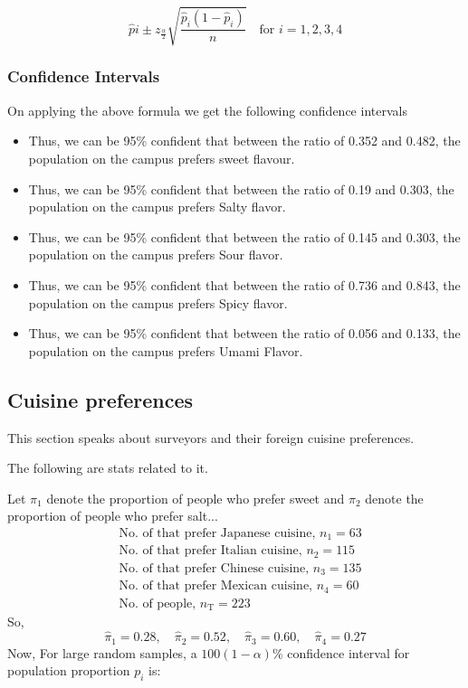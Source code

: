 \documentclass[12pt]{article}
\begin{document}
    
    
    \[
    \hat{p}i \pm z_{\frac{\alpha}{2}} \sqrt{\frac{\hat{p}_i(1 - \hat{p}_i)}{n}}
    \quad \text{for } i = 1, 2, 3, 4
    \]
\subsubsection{Confidence Intervals}
    On applying the above formula we get the following confidence intervals
    \begin{itemize}
        \item Thus, we can be 95\% confident that between the ratio of 0.352 and 0.482, the population on the campus prefers sweet flavour.
        
        \item Thus, we can be 95\% confident that between the ratio of 0.19 and 0.303, the population on the campus prefers Salty flavor.
        
        \item Thus, we can be 95\% confident that between the ratio of 0.145 and 0.303, the population on the campus prefers Sour flavor.
        
        \item Thus, we can be 95\% confident that between the ratio of 0.736 and 0.843, the population on the campus prefers Spicy flavor.
        
        \item Thus, we can be 95\% confident that between the ratio of 0.056 and 0.133, the population on the campus prefers Umami Flavor.
    \end{itemize}


\subsection{Cuisine preferences }
 This section speaks about surveyors and their foreign cuisine preferences.
    
    The following are stats related to it.
    
    Let $\pi_1$ denote the proportion of people who prefer sweet and $\pi_2$ denote the proportion of people who prefer salt...
    \begin{align}
        &\text{No. of that prefer Japanese cuisine, } n_{\text{1}} = 63 \\
        &\text{No. of that prefer Italian cuisine, } n_{\text{2}} = 115 \\
        &\text{No. of that prefer Chinese cuisine, } n_{\text{3}} = 135\\
        &\text{No. of that prefer Mexican cuisine, } n_{\text{4}} = 60\\
        &\text{No. of people, } n_{\text{T}} = 223
    \end{align}
    So,
    \begin{equation}
        \hat{\pi}_1  = 0.28, \quad \hat{\pi}_2  = 0.52, \quad \hat{\pi}_3  = 0.60, \quad \hat{\pi}_4  = 0.27
    \end{equation}
  Now,
  For large random samples, a $100(1 - \alpha)\%$ confidence interval for population proportion $p_i$ is:
    
\end{document}
